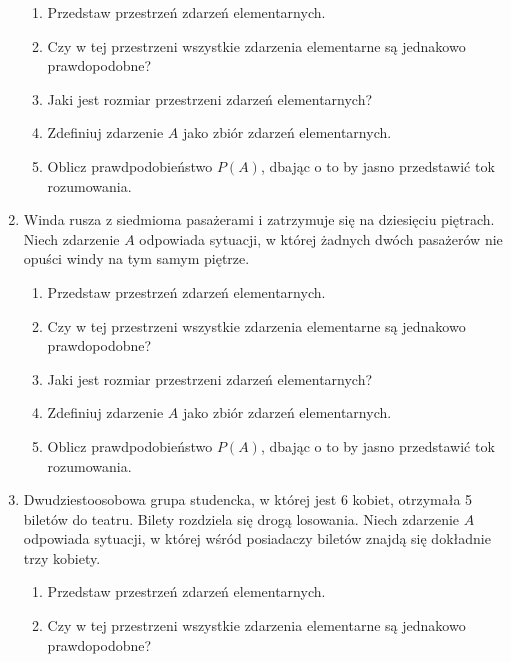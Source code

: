\documentclass{mwart}
\newcommand{\ans}[1]{}
\newcommand{\ans}[1]{\emph{Odpowiedź:} #1}
\begin{document}
\begin{enumerate}
\begin{enumerate}
\item Przedstaw przestrzeń zdarzeń elementarnych. \ans{$\Omega=\{\omega_J|\left|J\right|=50 \land J\subset\{1,2,\ldots,100\}\}$}%
\item Czy w tej przestrzeni wszystkie zdarzenia elementarne są jednakowo prawdopodobne? \ans{Tak}%
\item Jaki jest rozmiar przestrzeni zdarzeń elementarnych? \ans{$\left|\Omega\right|={100\choose 50}$}%
\item Zdefiniuj zdarzenie $A$ jako zbiór zdarzeń elementarnych. \ans{$A=\{\omega_J|\left|J\cap \{1,2,\ldots,5\}\right|\leq 1\}$}%
\item Oblicz prawdpodobieństwo $P(A)$, dbając o to by jasno przedstawić tok rozumowania. \ans{$\left|A\right|={5\choose 1}{95\choose 49}+{95\choose 50}, P(A)\approx0{,}181$}%
\end{enumerate}%
\item Winda rusza z siedmioma pasażerami i zatrzymuje się na dziesięciu piętrach. Niech zdarzenie $A$ odpowiada sytuacji, w której żadnych dwóch pasażerów nie opuści windy na tym samym piętrze.
\begin{enumerate}%
\item Przedstaw przestrzeń zdarzeń elementarnych. \ans{$\Omega=\{\omega_{i_1,\ldots,i_7}|i_j=1,2,\ldots,10\}$}%
\item Czy w tej przestrzeni wszystkie zdarzenia elementarne są jednakowo prawdopodobne? \ans{Tak}%
\item Jaki jest rozmiar przestrzeni zdarzeń elementarnych? \ans{$\left|\Omega\right|=10^7$}%
\item Zdefiniuj zdarzenie $A$ jako zbiór zdarzeń elementarnych. \ans{$A=\{\omega_{i_1,\ldots,i_7}|\forall j,k\colon j\neq k\to i_j\neq i_k\}, \left|A\right|=\frac{10!}{3!}=604800$}%
\item Oblicz prawdpodobieństwo $P(A)$, dbając o to by jasno przedstawić tok rozumowania. \ans{$P(A)=\frac{604800}{10^7}=0{,}06$}%
\end{enumerate}%
\item Dwudziestoosobowa grupa studencka, w której jest 6 kobiet, otrzymała 5 biletów do teatru. Bilety rozdziela się drogą losowania. Niech zdarzenie $A$ odpowiada sytuacji, w której wśród posiadaczy biletów znajdą się dokładnie trzy kobiety.
\begin{enumerate}%
\item Przedstaw przestrzeń zdarzeń elementarnych. \ans{$\Omega=\{\omega_J|\left|J\right|=5 \land J\subset\{1,2,\ldots,20\}\}$}%
\item Czy w tej przestrzeni wszystkie zdarzenia elementarne są jednakowo prawdopodobne? \ans{Tak}%

\end{enumerate}
\end{enumerate}
\end{document}
